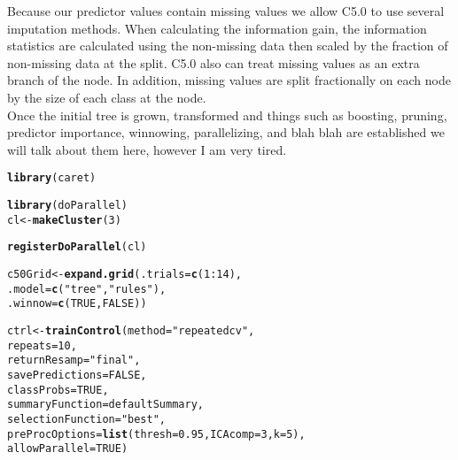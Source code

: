 \documentclass[11pt]{article}\usepackage[]{graphicx}\usepackage[]{color}
\makeatletter
\newcommand{\hlnum}[1]{\textcolor[rgb]{0.686,0.059,0.569}{#1}}%
\newcommand{\hlstr}[1]{\textcolor[rgb]{0.192,0.494,0.8}{#1}}%
\newcommand{\hlopt}[1]{\textcolor[rgb]{0,0,0}{#1}}%
\newcommand{\hlstd}[1]{\textcolor[rgb]{0.345,0.345,0.345}{#1}}%
\newcommand{\hlkwb}[1]{\textcolor[rgb]{0.69,0.353,0.396}{#1}}%
\newcommand{\hlkwc}[1]{\textcolor[rgb]{0.333,0.667,0.333}{#1}}%
\newcommand{\hlkwd}[1]{\textcolor[rgb]{0.737,0.353,0.396}{\textbf{#1}}}%
\newenvironment{kframe}{%
 \def\at@end@of@kframe{}%
 \ifinner\ifhmode%
  \def\at@end@of@kframe{\end{minipage}}%
  \begin{minipage}{\columnwidth}%
 \fi\fi%
 \def\FrameCommand##1{\hskip\@totalleftmargin \hskip-\fboxsep
 \colorbox{shadecolor}{##1}\hskip-\fboxsep
     \hskip-\linewidth \hskip-\@totalleftmargin \hskip\columnwidth}%
 \MakeFramed {\advance\hsize-\width
   \@totalleftmargin\z@ \linewidth\hsize
   \@setminipage}}%
 {\par\unskip\endMakeFramed%
 \at@end@of@kframe}
\newenvironment{knitrout}{}{} %
\makeatother
\begin{document}
Because our predictor values contain missing values we allow C5.0 to use several imputation methods. When calculating the information gain, the information statistics are calculated using the non-missing data then scaled by the fraction of non-missing data at the split. C5.0 also can treat missing values as an extra branch of the node. In addition, missing values are split fractionally on each node by the size of each class at the node.\\

Once the initial tree is grown, transformed and things such as boosting, pruning, predictor importance, winnowing, parallelizing, and blah blah are established we will talk about them here, however I am very tired.




\begin{knitrout}
\color{fgcolor}\begin{kframe}
\begin{alltt}
\hlkwd{library}\hlstd{(caret)}

\hlkwd{library}\hlstd{(doParallel)}
 \hlstd{cl} \hlkwb{<-} \hlkwd{makeCluster}\hlstd{(}\hlnum{3}\hlstd{)}

 \hlkwd{registerDoParallel}\hlstd{(cl)}

\hlstd{c50Grid} \hlkwb{<-} \hlkwd{expand.grid}\hlstd{(}\hlkwc{.trials} \hlstd{=} \hlkwd{c}\hlstd{(}\hlnum{1}\hlopt{:}\hlnum{14}\hlstd{),}
                       \hlkwc{.model} \hlstd{=} \hlkwd{c}\hlstd{(}\hlstr{"tree"}\hlstd{,} \hlstr{"rules"}\hlstd{),}
                       \hlkwc{.winnow} \hlstd{=} \hlkwd{c}\hlstd{(}\hlnum{TRUE}\hlstd{,} \hlnum{FALSE}\hlstd{))}

\hlstd{ctrl} \hlkwb{<-} \hlkwd{trainControl}\hlstd{(}\hlkwc{method} \hlstd{=} \hlstr{"repeatedcv"}\hlstd{,}
             \hlkwc{repeats} \hlstd{=} \hlnum{10}\hlstd{,}
             \hlkwc{returnResamp} \hlstd{=} \hlstr{"final"}\hlstd{,}
             \hlkwc{savePredictions} \hlstd{=} \hlnum{FALSE}\hlstd{,}
             \hlkwc{classProbs} \hlstd{=} \hlnum{TRUE}\hlstd{,}
             \hlkwc{summaryFunction} \hlstd{= defaultSummary,}
             \hlkwc{selectionFunction} \hlstd{=} \hlstr{"best"}\hlstd{,}
             \hlkwc{preProcOptions} \hlstd{=} \hlkwd{list}\hlstd{(}\hlkwc{thresh} \hlstd{=} \hlnum{0.95}\hlstd{,} \hlkwc{ICAcomp} \hlstd{=} \hlnum{3}\hlstd{,} \hlkwc{k} \hlstd{=} \hlnum{5}\hlstd{),}
             \hlkwc{allowParallel} \hlstd{=} \hlnum{TRUE}\hlstd{)}



\end{alltt}
\end{kframe}
\end{knitrout}
\end{document}

